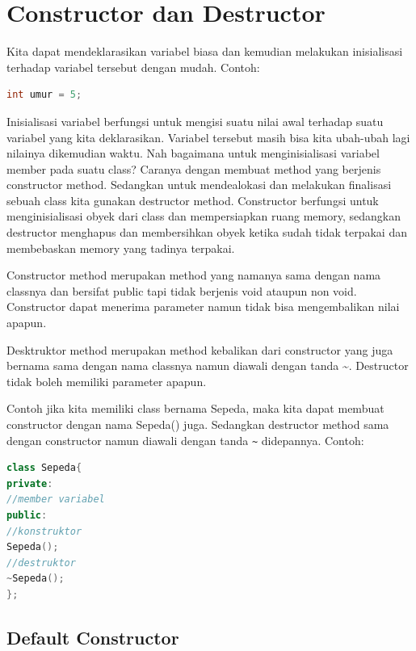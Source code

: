 \section{Constructor dan
Destructor}\label{constructor-dan-destructor}

Kita dapat mendeklarasikan variabel biasa dan kemudian melakukan
inisialisasi terhadap variabel tersebut dengan mudah. Contoh:

\begin{lstlisting}[language=c++, numbers=none]
int umur = 5;
\end{lstlisting}

Inisialisasi variabel berfungsi untuk mengisi suatu nilai awal terhadap
suatu variabel yang kita deklarasikan. Variabel tersebut masih bisa kita
ubah-ubah lagi nilainya dikemudian waktu. Nah bagaimana untuk
menginisialisasi variabel member pada suatu class? Caranya dengan
membuat method yang berjenis constructor method. Sedangkan untuk
mendealokasi dan melakukan finalisasi sebuah class kita gunakan
destructor method. Constructor berfungsi untuk menginisialisasi obyek
dari class dan mempersiapkan ruang memory, sedangkan destructor
menghapus dan membersihkan obyek ketika sudah tidak terpakai dan
membebaskan memory yang tadinya terpakai.

Constructor method merupakan method yang namanya sama dengan nama
classnya dan bersifat public tapi tidak berjenis void ataupun non void.
Constructor dapat menerima parameter namun tidak bisa mengembalikan
nilai apapun.

Desktruktor method merupakan method kebalikan dari constructor yang juga
bernama sama dengan nama classnya namun diawali dengan tanda
\textasciitilde{}. Destructor tidak boleh memiliki parameter apapun.

Contoh jika kita memiliki class bernama Sepeda, maka kita dapat membuat
constructor dengan nama Sepeda() juga. Sedangkan destructor method sama
dengan constructor namun diawali dengan tanda \texttt{\textasciitilde{}}
didepannya. Contoh:

\begin{lstlisting}[language=c++, numbers=none]
class Sepeda{
private:
//member variabel
public:
//konstruktor
Sepeda();
//destruktor
~Sepeda();
};
\end{lstlisting}

\subsection{Default Constructor}\label{default-constructor}

